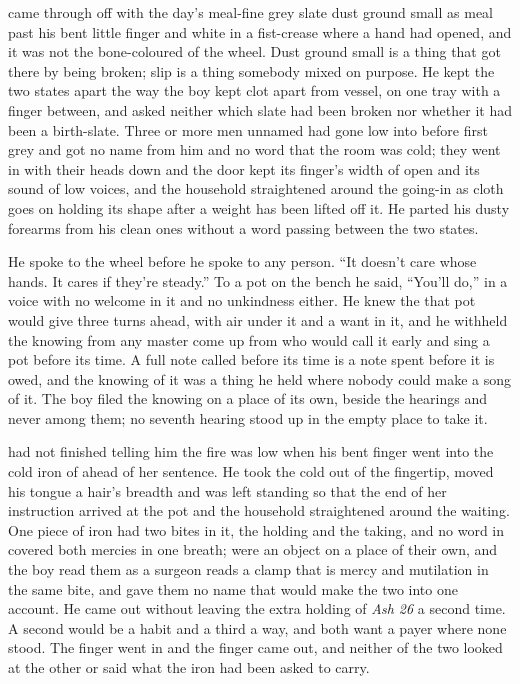  came through  off  with the day's meal-fine grey slate dust ground small as meal past his bent little finger and white in a fist-crease where a hand had opened, and it was not the bone-coloured  of the wheel. Dust ground small is a thing that got there by being broken; slip is a thing somebody mixed on purpose. He kept the two states apart the way the boy kept clot apart from vessel, on one tray with a finger between, and asked neither which slate had been broken nor whether it had been a birth-slate. Three or more men unnamed had gone low into  before first grey and got no name from him and no word that the room was cold; they went in with their heads down and the door kept its finger's width of open and its sound of low voices, and the household straightened around the going-in as cloth goes on holding its shape after a weight has been lifted off it. He parted his dusty forearms from his clean ones without a word passing between the two states.

He spoke to the wheel before he spoke to any person. “It doesn't care whose hands. It cares if they're steady.” To a pot on the bench he said, “You'll do,” in a voice with no welcome in it and no unkindness either. He knew the  that pot would give three turns ahead, with air under it and a want in it, and he withheld the knowing from any master come up from  who would call it early and sing a pot before its time. A full note called before its time is a note spent before it is owed, and the knowing of it was a thing he held where nobody could make a song of it. The boy filed the knowing on a place of its own, beside the hearings and never among them; no seventh hearing stood up in the empty place to take it.

 had not finished telling him the fire was low when his bent finger went into the cold iron of  ahead of her sentence. He took the cold out of the fingertip, moved his tongue a hair's breadth and was left standing so that the end of her instruction arrived at the pot and the household straightened around the waiting. One piece of iron had two bites in it, the holding and the taking, and no word in  covered both mercies in one breath;  were an object on a place of their own, and the boy read them as a surgeon reads a clamp that is mercy and mutilation in the same bite, and gave them no name that would make the two into one account. He came out without leaving the extra holding of \emph{Ash 26} a second time. A second would be a habit and a third a way, and both want a payer where none stood. The finger went in and the finger came out, and neither of the two looked at the other or said what the iron had been asked to carry.

